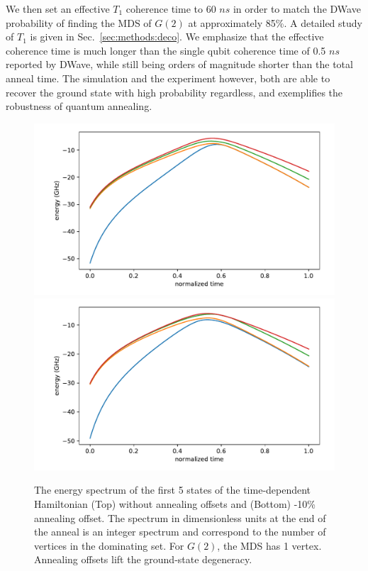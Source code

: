 \documentclass[prd,twocolumn,tightenlines,preprintnumbers,showpacs,superscriptaddress,notitlepage,nofootinbib,eqsecnum,floatfix,longbibliography]{revtex4}
\begin{document}
We then set an effective $T_1$ coherence time to 60 $ns$ in order to match the DWave probability of finding the MDS of $G(2)$ at approximately 85\%. A detailed study of $T_1$ is given in Sec.~\ref{sec:methods:deco}. We emphasize that the effective coherence time is much longer than the single qubit coherence time of 0.5 $ns$ reported by DWave, while still being orders of magnitude shorter than the total anneal time. The simulation and the experiment however, both are able to recover the ground state with high probability regardless, and exemplifies the robustness of quantum annealing.

\begin{figure}
	\centering
	\includegraphics[width=\columnwidth]{./figures/spectrum.pdf}
	\includegraphics[width=\columnwidth]{./figures/spectrum_offset.pdf}
	\caption{The energy spectrum of the first 5 states of the time-dependent Hamiltonian (Top) without annealing offsets and (Bottom) -10\% annealing offset. The spectrum in dimensionless units at the end of the anneal is an integer spectrum and correspond to the number of vertices in the dominating set. For $G(2)$, the MDS has 1 vertex. Annealing offsets lift the ground-state degeneracy.}
	\label{fig:spectrum}
\end{figure}
\end{document}
